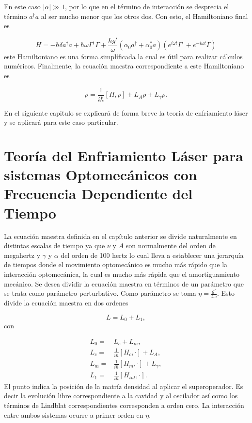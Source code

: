 \documentclass[a4paper,10pt]{report}
\begin{document}
En este caso $|\alpha| \gg 1$, por lo que en el término de interacción se desprecia el término $a^\dagger a$ al ser mucho menor que los otros dos. Con esto, el Hamiltoniano final es

\begin{equation}
H = -\hbar \delta a^{\dagger}a +\hbar\omega\Gamma^{\dagger}\Gamma +\frac{\hbar g'}{\omega}(\alpha_0 a^{\dagger}+\alpha^*_0 a)(e^{i\omega t}\Gamma^{\dagger}+e^{-i\omega t}\Gamma)
\end{equation} este Hamiltoniano es una forma simplíficada la cual es útil para realizar cálculos numéricos. Finalmente, la ecuación maestra correspondiente a este Hamiltoniano es

\begin{equation}\label{LCMasterEq}
\dot{\rho} = \frac{1}{i\hbar}[H,\rho] +L_A\rho + L_\gamma \rho.
\end{equation}

En el siguiente capitulo se explicará de forma breve la teoría de enfriamiento láser y se aplicará para este caso particular.

\chapter{Teoría del Enfriamiento Láser para sistemas Optomecánicos con Frecuencia Dependiente del Tiempo}

La ecuación maestra definida en el capítulo anterior se divide naturalmente en distintas escalas de tiempo ya que $\nu$ y $A$ son normalmente del orden de megahertz y $\gamma$ y $\alpha$ del orden de 100 hertz lo cual lleva a establecer una jerarquía de tiempos donde el movimiento optomecánico es mucho más rápido que la interacción optomecánica, la cual es mucho más rápida que el amortiguamiento mecánico. Se desea dividir la ecuación maestra en términos de un parámetro que se trata como parámetro perturbativo. Como parámetro se toma $\eta=\frac{g'}{4\omega}$. Esto divide la ecuación maestra en dos ordenes

\begin{equation}
L = L_0 + L_1,
\end{equation} con

\begin{align*}
L_0 =& L_c + L_m,\\
L_c =& \frac{1}{i\hbar}[H_c,\cdot] + L_A,\\
L_m =& \frac{1}{i\hbar}[H_m,\cdot] + L_\gamma,\\
L_1 =& \frac{1}{i\hbar}[H_{int},\cdot].
\end{align*} El punto indica la posición de la matríz densidad al aplicar el superoperador. Es decir la evolución libre correspondiente a la cavidad y al oscilador así como los términos de Lindblat correspondientes corresponden a orden cero. La interacción entre ambos sistemas ocurre a primer orden en $\eta$.
\end{document}
